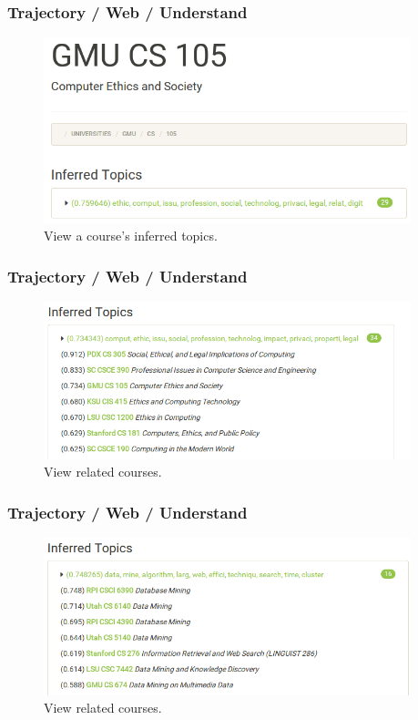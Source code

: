 \documentclass[10pt, compress]{beamer}
\begin{document}
\begin{frame}
  \frametitle{Trajectory / Web / Understand}
  \begin{figure}
    \centering
    \includegraphics[width=0.95\textwidth]{figs/shots/course_detail.png}
    \caption{View a course's inferred topics.}
  \end{figure}
\end{frame}

\begin{frame}
  \frametitle{Trajectory / Web / Understand}
  \begin{figure}
    \centering
    \includegraphics[width=0.95\textwidth]{figs/shots/related_ethics.png}
    \caption{View related courses.}
  \end{figure}
\end{frame}

\begin{frame}
  \frametitle{Trajectory / Web / Understand}
  \begin{figure}
    \centering
    \includegraphics[width=0.95\textwidth]{figs/shots/related_data_mining.png}
    \caption{View related courses.}
  \end{figure}
\end{frame}
\end{document}
